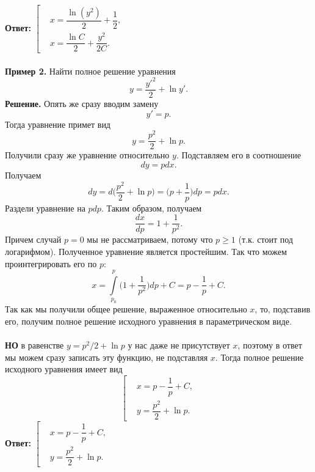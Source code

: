 \documentclass[a4paper, 12pt]{article}
\begin{document}
\textbf{Ответ:} $\left[\begin{aligned}
	&x = \dfrac{\ln (y^2)}{2} + \dfrac{1}{2},\\
	&x = \dfrac{\ln C}{2} + \dfrac{y^2}{2C}.
\end{aligned}\right.$\\\\
\textbf{Пример 2.} Найти полное решение уравнения $$y = \dfrac{y'^2}{2} + \ln y'.$$
\textbf{Решение.} Опять же сразу вводим замену $$y' = p.$$
Тогда уравнение примет вид $$y = \dfrac{p^2}{2} + \ln p.$$
Получили сразу же уравнение относительно $y$. Подставляем его в соотношение $$dy = pdx.$$
Получаем $$dy = d\Big( \dfrac{p^2}{2} + \ln p\Big) = \Big(p + \dfrac{1}{p}\Big)dp = p dx.$$
Раздели уравнение на $pdp$. Таким образом, получаем $$\dfrac{dx}{dp} = 1 + \dfrac{1}{p^2}.$$
Причем случай $p = 0$ мы не рассматриваем, потому что $p \geqslant 1$ (т.к. стоит под логарифмом). Полученное уравнение является простейшим. Так что можем проинтегрировать его по $p$:
$$x = \int\limits_{p_0}^p \Big(1 + \dfrac{1}{p^2}\Big)dp + C = p - \dfrac{1}{p} + C.$$
Так как мы получили общее решение, выраженное относительно $x$, то, подставив его, получим полное решение исходного уравнения в параметрическом виде.\\\\ \textbf{НО} в равенстве $y = p^2/2 + \ln p$ у нас даже не присутствует $x$, поэтому в ответ мы можем сразу записать эту функцию, не подставляя $x$. Тогда полное решение исходного уравнения имеет вид
$$\left[\begin{aligned}
	&x=p - \dfrac{1}{p} + C,\\
	&y = \dfrac{p^2}{2} + \ln p.
\end{aligned}\right.$$
\textbf{Ответ:} $\left[\begin{aligned}
	&x=p - \dfrac{1}{p} + C,\\
	&y = \dfrac{p^2}{2} + \ln p.
\end{aligned}\right.$\\\\
\end{document}
